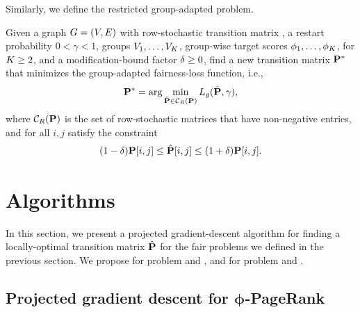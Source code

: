 \documentclass[sigconf, anonymous, review]{acmart}
\begin{document}
Similarly, we define the restricted group-adapted \phiPageRank problem.

\begin{problem}
Given a graph $G = (V, E)$ with  
row-stochastic transition matrix \transmatrix, 
a restart probability $0 < \gamma < 1$, 
groups $V_1, \ldots, V_K$, 
group-wise target \pagerank scores $\phi_1,  \ldots, \phi_K$, 
for $K\ge 2$, 
and a modification-bound factor $\delta \ge 0$,
find a new transition matrix $\mathbf{{P}}^{*}$ that minimizes the group-adapted fairness-loss function, i.e.,
\begin{equation*}
    \mathbf{{P}}^{*} = \arg\min_{\hat{\mathbf{{P}}} \in \mathcal{C}_R(\mathbf{{P}})} 
                         L_{\mathit{g}}(\hat{\mathbf{{P}}}, \gamma),
\end{equation*}
where $\mathcal{C}_R(\mathbf{{P}})$ is the set of row-stochastic matrices
that have non-negative entries, and for all $i, j$ satisfy the constraint
\begin{equation*}
    (1 - \delta) \mathbf{{P}}[i, j] \le \hat{\mathbf{{P}}}[i, j] \le (1 + \delta) \mathbf{{P}}[i, j] .
\end{equation*} 
\end{problem}
\fi

\section{Algorithms}

In this section, we present a projected gradient-descent algorithm 
for finding a locally-optimal transition matrix $\hat{\mathbf{{P}}}$ for the 
fair \pagerank problems we defined in the previous section. We propose  for problem  and , and  for problem  and .

\subsection{Projected gradient descent for \texorpdfstring{$\boldsymbol{\phi}$}{phi}-PageRank}
\end{document}
